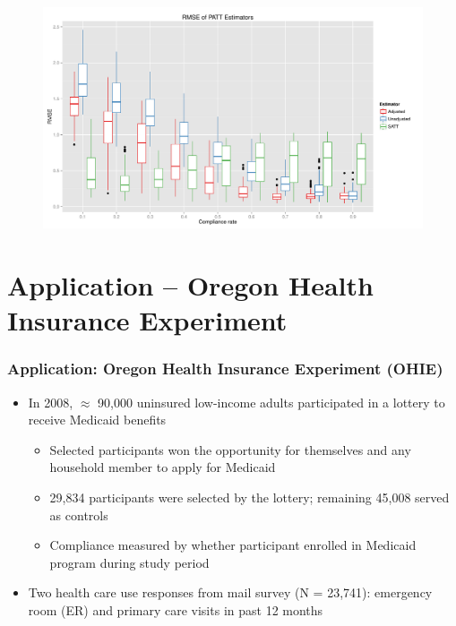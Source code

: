 \documentclass{beamer}
\begin{document}
\begin{frame}
\begin{figure}[htbp]
\centering
   \includegraphics[width=\linewidth]{../paper/rmse_boxplots.pdf} 
\label{simulation-plot}
\end{figure}
\end{frame}



\section[Application]{Application -- Oregon Health Insurance Experiment}

\begin{frame}
\frametitle{Application: Oregon Health Insurance Experiment (OHIE)}
\begin{itemize}
\item In 2008, $\approx$ 90,000 uninsured low-income adults participated in a lottery to receive Medicaid benefits \citep{finkelstein2012}
\begin{itemize}
\item Selected participants won the opportunity for themselves and any household member to apply for Medicaid
\item 29,834 participants were selected by the lottery; remaining 45,008 served as controls 
\item Compliance measured by whether participant enrolled in Medicaid program during study period
\end{itemize}
\item Two health care use responses from mail survey (N = 23,741): emergency room (ER) and primary care visits in past 12 months
\end{itemize}
\end{frame}
\end{document}
